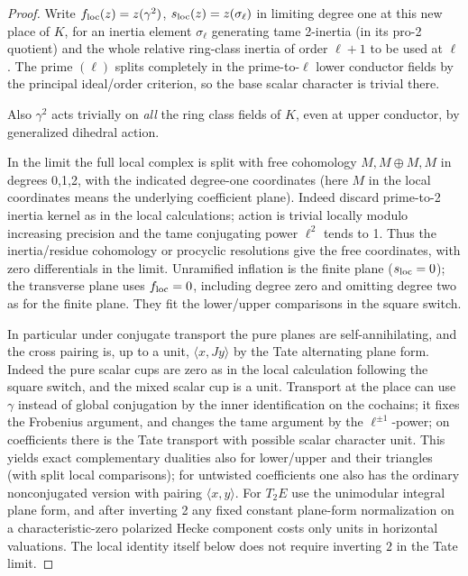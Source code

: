 \begin{proof}
Write \(f_{\rm loc}(z)=z(\gamma^2)\), \(s_{\rm loc}(z)=z(\sigma_\ell)\) in limiting degree one at this new place of \(K\), for an inertia element \(\sigma_\ell\) generating tame 2-inertia (in its pro-2 quotient) and the whole relative ring-class inertia of order \(\ell+1\) to be used at \(\ell\). The prime \((\ell)\) splits completely in the prime-to-\(\ell\) lower conductor fields by the principal ideal/order criterion, so the base scalar character is trivial there.

Also \(\gamma^2\) acts trivially on \emph{all} the ring class fields of \(K\), even at upper conductor, by generalized dihedral action.

In the limit the full local complex is split with free cohomology \(M,M\oplus M,M\) in degrees 0,1,2, with the indicated degree-one coordinates (here \(M\) in the local coordinates means the underlying coefficient plane). Indeed discard prime-to-2 inertia kernel as in the local calculations; action is trivial locally modulo increasing precision and the tame conjugating power \(\ell^2\) tends to 1. Thus the inertia/residue cohomology or procyclic resolutions give the free coordinates, with zero differentials in the limit. Unramified inflation is the finite plane (\(s_{\rm loc}=0\)); the transverse plane uses \(f_{\rm loc}=0\), including degree zero and omitting degree two as for the finite plane. They fit the lower/upper comparisons in the square switch.

In particular under conjugate transport the pure planes are self-annihilating, and the cross pairing is, up to a unit, \(\langle x,J y\rangle\) by the Tate alternating plane form. Indeed the pure scalar cups are zero as in the local calculation following the square switch, and the mixed scalar cup is a unit. Transport at the place can use \(\gamma\) instead of global conjugation by the inner identification on the cochains; it fixes the Frobenius argument, and changes the tame argument by the \(\ell^{\pm1}\)-power; on coefficients there is the Tate transport with possible scalar character unit. This yields exact complementary dualities also for lower/upper and their triangles (with split local comparisons); for untwisted coefficients one also has the ordinary nonconjugated version with pairing \(\langle x,y\rangle\). For \(T_2 E\) use the unimodular integral plane form, and after inverting 2 any fixed constant plane-form normalization on a characteristic-zero polarized Hecke component costs only units in horizontal valuations. The local identity itself below does not require inverting \(2\) in the Tate limit.
\end{proof}


